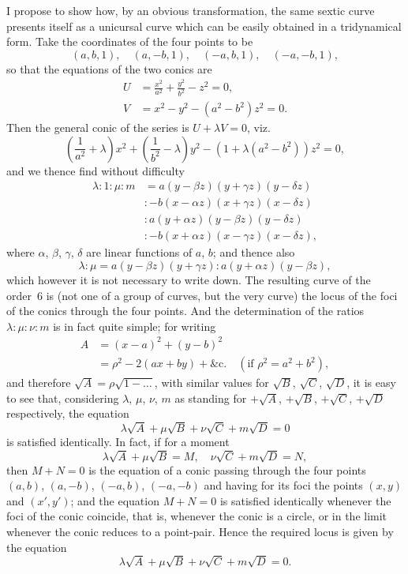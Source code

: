 \documentclass[11pt,a4paper]{article}
\theoremstyle{plain}
\theoremstyle{definition}
\begin{document}
I propose to show how, by an obvious transformation, the same sextic curve
presents itself as a unicursal curve which can be easily obtained in a tridynamical
form.  Take the coordinates of the four points to be
\[
(a,b,1), \quad (a,-b,1), \quad (-a,b,1), \quad (-a,-b,1),
\]
so that the equations of the two conics are
\begin{align*}
U &= \tfrac{x^2}{a^2} + \tfrac{y^2}{b^2} - z^2 = 0, \\
V &= x^2 - y^2 - (a^2-b^2)z^2 = 0.
\end{align*}
Then the general conic of the series is $U + \lambda V = 0$, viz.
\[
\left(\frac{1}{a^2}+\lambda\right)x^2 + \left(\frac{1}{b^2}-\lambda\right)y^2 - (1+\lambda(a^2-b^2))z^2 = 0,
\]
and we thence find without difficulty
\begin{align*}
\lambda : 1 : \mu : m &=
a(y - \beta z)(y + \gamma z)(y - \delta z) \\
&: -b(x - \alpha z)(x + \gamma z)(x - \delta z) \\
&: a(y + \alpha z)(y - \beta z)(y - \delta z) \\
&: -b(x + \alpha z)(x - \gamma z)(x - \delta z),
\end{align*}
where $\alpha$, $\beta$, $\gamma$, $\delta$ are linear functions of $a$, $b$; and thence also
\[
\lambda : \mu = a(y - \beta z)(y + \gamma z) : a(y + \alpha z)(y - \beta z),
\]
which however it is not necessary to write down.  The resulting curve of the
order~6 is (not one of a group of curves, but the very curve) the locus of the foci
of the conics through the four points.  And the determination of the ratios
$\lambda : \mu : \nu : m$ is in fact quite simple; for writing
\begin{align*}
A &= (x-a)^2 + (y-b)^2 \\
  &= \rho^2 - 2(ax + by) + \&\text{c.} \quad (\text{if } \rho^2 = a^2 + b^2),
\end{align*}
and therefore $\sqrt{A} = \rho \sqrt{1 - \dots}$, with similar values for $\sqrt{B}$, $\sqrt{C}$, $\sqrt{D}$,
it is easy to see that, considering $\lambda$, $\mu$, $\nu$, $m$ as standing for $+\sqrt{A}$, $+\sqrt{B}$,
$+\sqrt{C}$, $+\sqrt{D}$ respectively, the equation
\[
\lambda\sqrt{A} + \mu\sqrt{B} + \nu\sqrt{C} + m\sqrt{D} = 0
\]
is satisfied identically.  In fact, if for a moment
\[
\lambda\sqrt{A} + \mu\sqrt{B} = M, \quad \nu\sqrt{C} + m\sqrt{D} = N,
\]
then $M+N=0$ is the equation of a conic passing through the four points
$(a,b)$, $(a,-b)$, $(-a,b)$, $(-a,-b)$ and having for its foci the points
$(x,y)$ and $(x',y')$; and the equation $M+N=0$ is satisfied identically
whenever the foci of the conic coincide, that is, whenever the conic is a circle,
or in the limit whenever the conic reduces to a point-pair.  Hence the required
locus is given by the equation
\[
\lambda\sqrt{A} + \mu\sqrt{B} + \nu\sqrt{C} + m\sqrt{D} = 0.
\]
\end{document}

